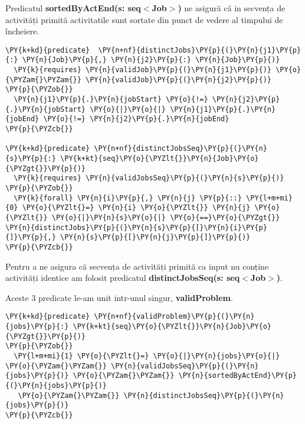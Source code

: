 Predicatul \textbf{sortedByActEnd(s: seq$<$Job$>$)} ne asigură că in secvența de activități primită activitatile sunt sortate din punct de vedere al timpului de încheiere. 
\begin{Verbatim}[commandchars=\\\{\}, fontsize=\small]
\PY{k+kd}{predicate}  \PY{n+nf}{distinctJobs}\PY{p}{(}\PY{n}{j1}\PY{p}{:} \PY{n}{Job}\PY{p}{,} \PY{n}{j2}\PY{p}{:} \PY{n}{Job}\PY{p}{)}
  \PY{k}{requires} \PY{n}{validJob}\PY{p}{(}\PY{n}{j1}\PY{p}{)} \PY{o}{\PYZam{}\PYZam{}} \PY{n}{validJob}\PY{p}{(}\PY{n}{j2}\PY{p}{)}
\PY{p}{\PYZob{}}
  \PY{n}{j1}\PY{p}{.}\PY{n}{jobStart} \PY{o}{!=} \PY{n}{j2}\PY{p}{.}\PY{n}{jobStart} \PY{o}{|}\PY{o}{|} \PY{n}{j1}\PY{p}{.}\PY{n}{jobEnd} \PY{o}{!=} \PY{n}{j2}\PY{p}{.}\PY{n}{jobEnd}
\PY{p}{\PYZcb{}}

\PY{k+kd}{predicate} \PY{n+nf}{distinctJobsSeq}\PY{p}{(}\PY{n}{s}\PY{p}{:} \PY{k+kt}{seq}\PY{o}{\PYZlt{}}\PY{n}{Job}\PY{o}{\PYZgt{}}\PY{p}{)}
  \PY{k}{requires} \PY{n}{validJobsSeq}\PY{p}{(}\PY{n}{s}\PY{p}{)}
\PY{p}{\PYZob{}}
  \PY{k}{forall} \PY{n}{i}\PY{p}{,} \PY{n}{j} \PY{p}{::} \PY{l+m+mi}{0} \PY{o}{\PYZlt{}=} \PY{n}{i} \PY{o}{\PYZlt{}} \PY{n}{j} \PY{o}{\PYZlt{}} \PY{o}{|}\PY{n}{s}\PY{o}{|} \PY{o}{==}\PY{o}{\PYZgt{}} \PY{n}{distinctJobs}\PY{p}{(}\PY{n}{s}\PY{p}{[}\PY{n}{i}\PY{p}{]}\PY{p}{,} \PY{n}{s}\PY{p}{[}\PY{n}{j}\PY{p}{]}\PY{p}{)}
\PY{p}{\PYZcb{}}
\end{Verbatim}

Pentru a ne asigura că secvența de activități primită ca input nu conține activități identice am folosit predicatul \textbf{distinctJobsSeq(s: seq$<$Job$>$)}. 

Aceste 3 predicate le-am unit intr-unul singur, \textbf{validProblem}.

\begin{Verbatim}[commandchars=\\\{\}, fontsize=\small]
    \PY{k+kd}{predicate} \PY{n+nf}{validProblem}\PY{p}{(}\PY{n}{jobs}\PY{p}{:} \PY{k+kt}{seq}\PY{o}{\PYZlt{}}\PY{n}{Job}\PY{o}{\PYZgt{}}\PY{p}{)}
\PY{p}{\PYZob{}}
  \PY{l+m+mi}{1} \PY{o}{\PYZlt{}=} \PY{o}{|}\PY{n}{jobs}\PY{o}{|} \PY{o}{\PYZam{}\PYZam{}} \PY{n}{validJobsSeq}\PY{p}{(}\PY{n}{jobs}\PY{p}{)} \PY{o}{\PYZam{}\PYZam{}} \PY{n}{sortedByActEnd}\PY{p}{(}\PY{n}{jobs}\PY{p}{)}
   \PY{o}{\PYZam{}\PYZam{}} \PY{n}{distinctJobsSeq}\PY{p}{(}\PY{n}{jobs}\PY{p}{)}
\PY{p}{\PYZcb{}}
\end{Verbatim}

